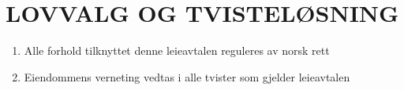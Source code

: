 \section{LOVVALG OG TVISTELØSNING}


    \begin{enumerate}


        \item Alle forhold tilknyttet denne leieavtalen reguleres av norsk rett

        \item Eiendommens verneting vedtas i alle tvister som gjelder leieavtalen


    \end{enumerate}
